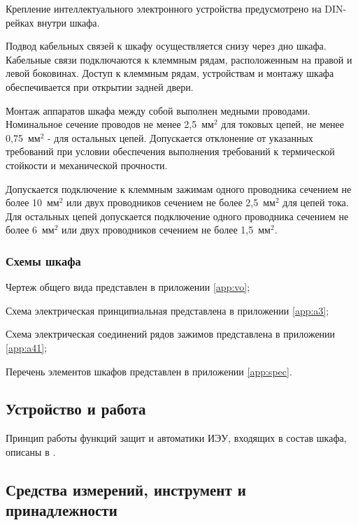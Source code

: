 \begin{enumsubsub}
  Крепление интеллектуального электронного устройства предусмотрено на DIN-рейках внутри шкафа.
\item Подвод кабельных связей к шкафу осуществляется снизу через дно шкафа. Кабельные связи подключаются к клеммным рядам, расположенным на правой и левой боковинах. Доступ к клеммным рядам, устройствам и монтажу шкафа обеспечивается при открытии задней двери.
\item Монтаж аппаратов шкафа между собой выполнен медными проводами. Номинальное сечение проводов не менее 2,5~мм$^2$ для токовых цепей, не менее 0,75~мм$^2$ - для остальных цепей. Допускается отклонение от указанных требований при условии обеспечения выполнения требований к термической стойкости и механической прочности.
\item Допускается подключение к клеммным зажимам одного проводника сечением не более 10~мм$^2$ или двух проводников сечением не более 2,5~мм$^2$ для цепей тока. Для остальных цепей допускается подключение одного проводника сечением не более 6~мм$^2$ или двух проводников сечением не более 1,5~мм$^2$.
\end{enumsubsub}

\subsubsection{Схемы шкафа}
\begin{enumsubsub}
\item Чертеж общего вида представлен в приложении \ref{app:vo};
\item Схема электрическая принципиальная представлена в приложении \ref{app:a3};
\item Схема электрическая соединений рядов зажимов представлена в приложении \ref{app:a41};
\item Перечень элементов шкафов представлен в приложении \ref{app:spec}.
\end{enumsubsub}

{\color{unimain}\subsection{Устройство и работа} \label{sec1:4}}

Принцип работы функций защит и автоматики ИЭУ, входящих в состав шкафа, описаны в \ManualUnitDefinite.

{\color{unimain}\subsection{Средства измерений, инструмент и принадлежности}}

